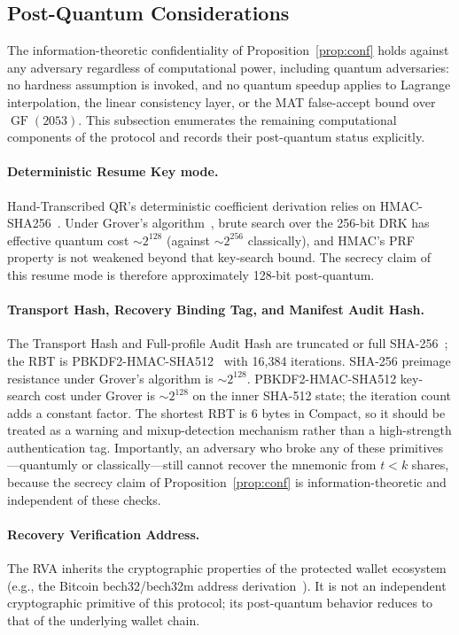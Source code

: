 \documentclass[11pt]{article}
\newcommand{\GF}{\operatorname{GF}}
\begin{document}
\subsection{Post-Quantum Considerations}
\label{sec:pq}

The information-theoretic confidentiality of Proposition~\ref{prop:conf} holds against any adversary regardless of computational power, including quantum adversaries: no hardness assumption is invoked, and no quantum speedup applies to Lagrange interpolation, the linear consistency layer, or the MAT false-accept bound over $\GF(2053)$. This subsection enumerates the remaining computational components of the protocol and records their post-quantum status explicitly.

\paragraph{Deterministic Resume Key mode.} Hand-Transcribed QR's deterministic coefficient derivation relies on HMAC-SHA256~\cite{rfc2104}. Under Grover's algorithm~\cite{grover1996}, brute search over the 256-bit DRK has effective quantum cost $\sim 2^{128}$ (against $\sim 2^{256}$ classically), and HMAC's PRF property is not weakened beyond that key-search bound. The secrecy claim of this resume mode is therefore approximately 128-bit post-quantum.

\paragraph{Transport Hash, Recovery Binding Tag, and Manifest Audit Hash.} The Transport Hash and Full-profile Audit Hash are truncated or full SHA-256~\cite{fips1804}; the RBT is PBKDF2-HMAC-SHA512~\cite{rfc2104} with 16,384 iterations. SHA-256 preimage resistance under Grover's algorithm is ${\sim}2^{128}$. PBKDF2-HMAC-SHA512 key-search cost under Grover is ${\sim}2^{128}$ on the inner SHA-512 state; the iteration count adds a constant factor. The shortest RBT is 6 bytes in Compact, so it should be treated as a warning and mixup-detection mechanism rather than a high-strength authentication tag. Importantly, an adversary who broke any of these primitives---quantumly or classically---still cannot recover the mnemonic from $t < k$ shares, because the secrecy claim of Proposition~\ref{prop:conf} is information-theoretic and independent of these checks.

\paragraph{Recovery Verification Address.} The RVA inherits the cryptographic properties of the protected wallet ecosystem (e.g., the Bitcoin bech32/bech32m address derivation~\cite{bip173,bip350}). It is not an independent cryptographic primitive of this protocol; its post-quantum behavior reduces to that of the underlying wallet chain.
\end{document}
